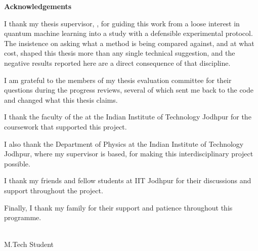 

\begin{flushright}
\huge{\textbf{Acknowledgements}}
\end{flushright}


I thank my thesis supervisor, \textit{\supname}, for guiding this work from a loose
interest in quantum machine learning into a study with a defensible experimental
protocol. The insistence on asking what a method is being compared against, and at
what cost, shaped this thesis more than any single technical suggestion, and the
negative results reported here are a direct consequence of that discipline.

I am grateful to the members of my thesis evaluation committee for their questions
during the progress reviews, several of which sent me back to the code and changed
what this thesis claims.

I thank the faculty of the \deptname{} at the Indian Institute of Technology Jodhpur
for the coursework that supported this project.

I also thank the Department of Physics at the Indian Institute of Technology Jodhpur,
where my supervisor is based, for making this interdisciplinary project possible.

I thank my friends and fellow students at IIT Jodhpur for their discussions
and support throughout the project.

Finally, I thank my family for their support and patience throughout this programme.

\begin{flushright}
\authorname  \\
M.Tech Student

\end{flushright}
